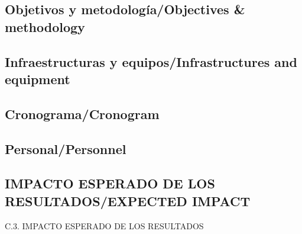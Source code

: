 \documentclass[a4paper,11pt,oneside]{article}
\begin{document}


\subsection*{\sc Objetivos y metodología/Objectives \& methodology}









\subsection*{\sc Infraestructuras y equipos/Infrastructures and equipment}

%

\subsection*{\sc Cronograma/Cronogram}

%

\subsection*{\sc Personal/Personnel}

\subsection{\sc IMPACTO ESPERADO DE LOS RESULTADOS/EXPECTED IMPACT}

C.3. IMPACTO ESPERADO DE LOS RESULTADOS 
%
%
%
%
\end{document}
